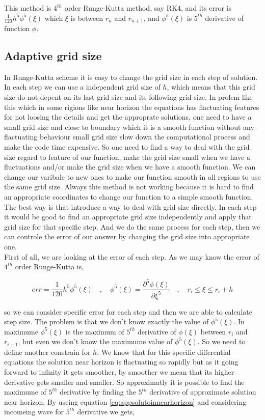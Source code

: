 This method is $4^{th}$ order Runge-Kutta method, say RK4, and its error is $\frac{1}{120}h^5\phi^{5}(\xi)$ which $\xi$ is between $r_n$ and $r_{n+1}$, and $\phi^{5}(\xi)$ is $5^{th}$ derivative of function $\phi$.

\subsection{Adaptive grid size}

In Runge-Kutta scheme it is easy to change the grid size in each step of solution. In each step we can use a independent grid size of $h$, which means that this grid size do not depent on its last grid size and its following grid size. In prolem like this which in some rigions like near horizon the equations has flactuating features for not loosing the details and get the approprate solutions, one need to have a small grid size and close to boundary which it is a smooth function without any flactuating behaviour small grid size slow down the computational process and make the code time expensive. So one need to find a way to deal with the grid size regard to feature of our function, make the grid size small when we have a fluctuations and/or make the grid size when we have a smooth function. We can change our varibale to new ones to make our function smooth in all regions to use the same grid size. Always this method is not working because it is hard to find an appropriate coordinates to change our function to a simple smooth function. The best way is that introduce a way to deal with grid size directly. In each step it would be good to find an appropriate grid size independently and apply that grid size for that specific step. And we do the same process for each step, then we can controle the error of our answer by changing the grid size into appropriate one.\\

First of all, we are looking at the error of each step. As we may know the error of $4^{th}$ order Runge-Kutta is,

\begin{equation} \label{eq:RK4err}
    err = \frac{1}{120}h^5\phi^{5}(\xi) \quad , \quad \phi^{5}(\xi) = \frac{\partial^5\phi(\xi)}{\partial \xi^5} \quad , \quad  r_i \leq \xi \leq r_i+h
\end{equation}

so we can consider specific error for each step and then we are able to calculate step size. The problem is that we don't know exactly the value of $\phi^{5}(\xi)$. In maximume $\phi^{5}(\xi)$ is the maximum of $5^{th}$ derivative of $\phi(\xi)$ between $r_{i}$ and $r_{i+1}$, but even we don't know the maximume value of $\phi^{5}(\xi)$. So we need to define another constrain for $h$. We know that for this specific differential equations the solution near horizon is flactuating so rapidly but as it going forward to infinity it gets smoother, by smoother we mean that its higher derivative gets smaller and smaller. So approximatly it is possible to find the maximume of $5^{th}$ derivative by finding the $5^{th}$ derivative of approximate solution near horizon. By useing equation \ref{eq:appsolutoinnearhorizon} and considering incomeing wave for $5^{th}$ derivative we gets,

